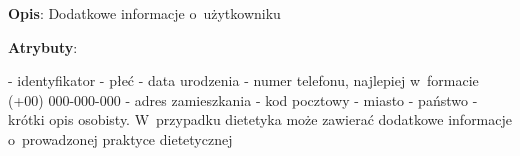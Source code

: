 \begin{enumerate}[label={\textbf{KAT/\protect\threedigits{\theenumi}}}, wide, labelwidth=!, labelindent=0pt, labelsep=0pt, series=reqs]
    \textbf{Opis}: Dodatkowe informacje o~użytkowniku
    \par
    \textbf{Atrybuty}:
    \begin{itemize}[series=atr, wide, align=left, leftmargin=190pt]
        \label{kat:UserExtraInfo:id}- identyfikator
        \label{kat:UserExtraInfo:gender}- płeć
        \label{kat:UserExtraInfo:dateOfBirth}- data urodzenia
        \label{kat:UserExtraInfo:phoneNumber}- numer telefonu, najlepiej w~formacie (+00) 000-000-000
        \label{kat:UserExtraInfo:streetAddress}- adres zamieszkania
        \label{kat:UserExtraInfo:postalCode}- kod pocztowy
        \label{kat:UserExtraInfo:city}- miasto
        \label{kat:UserExtraInfo:country}- państwo
        \label{kat:UserExtraInfo:personalDescription}- krótki opis osobisty. W~przypadku dietetyka może zawierać dodatkowe informacje o~prowadzonej praktyce dietetycznej
    \end{itemize}


\end{enumerate}
